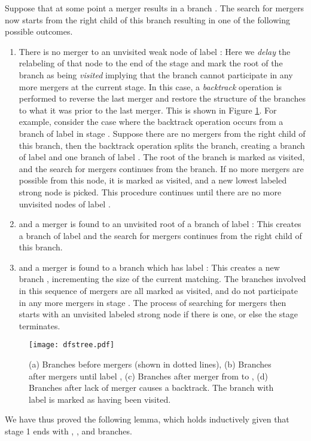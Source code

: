 \documentclass{article}
\begin{document}
Suppose that at some point a merger results in a  branch . The search for mergers now starts from the right child of this branch resulting in one of the following possible outcomes.
\begin{enumerate}
\item There is no merger to an unvisited weak node of label : Here we {\em delay} the relabeling of that node to the end of the stage and mark the root of the branch as being {\em visited} implying that the branch cannot participate in any more mergers at the current stage.  In this case, a {\em backtrack} operation is performed to reverse the last merger and restore the structure of the branches to what it was prior to the last merger. This is shown in Figure \ref{fig:dfstree2}. For example, consider the case where the backtrack operation occurs from a branch of label  in stage .  Suppose there are no mergers from the right child of this branch, then the backtrack operation splits the branch, creating a   branch of label  and one  branch of label . The root of the  branch is marked as visited, and the search for mergers continues from the  branch. If no more mergers are possible from this node, it is marked as visited, and a new lowest labeled strong node is picked.  This procedure continues until there are no more unvisited  nodes of label .
\item  and a merger is found to an unvisited root of a  branch of label : This creates a  branch of label  and the search for mergers continues from the right child of this branch.
\item  and a merger is found to a  branch which has label : This creates a new  branch , incrementing the size of the current matching. The branches involved in this sequence of mergers are all marked as visited, and do not participate in any more mergers in stage . The process of searching for mergers then starts with an unvisited  labeled strong node if there is one, or else the stage terminates.
\end{enumerate}

\begin{figure}[ht]
\centerline{\texttt{[image: dfstree.pdf]}}
\caption{\label{fig:dfstree2}
(a) Branches before mergers (shown in dotted lines),
(b) Branches after mergers until label ,
(c) Branches after merger from  to ,
(d) Branches after lack of merger causes a backtrack.
The branch with label  is marked as having been visited.}
\end{figure}
\noindent We have thus proved the following lemma, which holds inductively given that stage 1 ends with , , and  branches.
\end{document}
